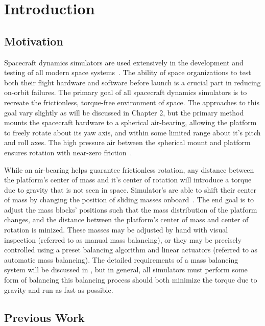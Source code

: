 \chapter{Introduction}

\section{Motivation}
Spacecraft dynamics simulators are used extensively in the development and testing of all modern space systems~\cite{schwartz_historical_2003}. The ability of space organizations to test both their flight hardware and software before launch is a crucial part in reducing on-orbit
failures. The primary goal of all spacecraft dynamics simulators is to recreate the frictionless, torque-free environment of space. The approaches to this goal vary slightly as will be discussed in Chapter 2, but the primary method mounts the spacecraft hardware to a spherical air-bearing, allowing the platform to freely rotate about its yaw axis, and within some limited range about it's pitch and roll axes. The high pressure air between the spherical mount and platform ensures rotation with near-zero friction~\cite{huang_characterizing_2022}.

While an air-bearing helps guarantee frictionless rotation, any distance between the platform's center of mass and it's center of rotation will introduce a torque due to gravity that is not seen in space. Simulator's are able to shift their center of mass by changing the position of sliding masses onboard~\cite{kim_automatic_2009}. The end goal is to adjust the mass blocks' positions such that the mass distribution of the platform changes, and the distance between the platform's center of mass and center of rotation is minized. These masses may be adjusted by hand with visual inspection (referred to as manual mass balancing), or they may be precisely controlled using a preset balancing algorithm and linear actuators (referred to as automatic mass balancing). The detailed requirements of a mass balancing system will be discussed in , but in general, all simulators must perform some form of balancing this balancing process should both minimize the torque due to gravity and run as fast as possible.



\section{Previous Work}\label{sec:previous_work}

